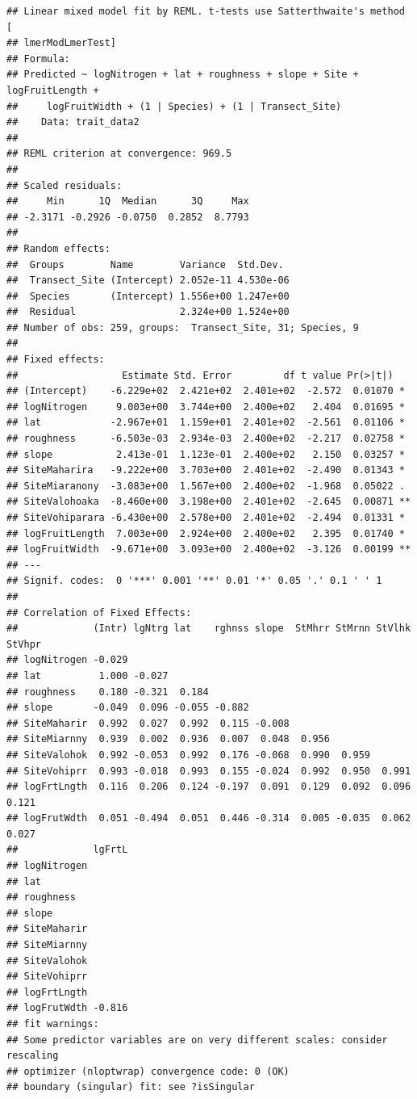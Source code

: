 \documentclass[
  12pt,
]{article}
\begin{document}
\begin{verbatim}
## Linear mixed model fit by REML. t-tests use Satterthwaite's method [
## lmerModLmerTest]
## Formula: 
## Predicted ~ logNitrogen + lat + roughness + slope + Site + logFruitLength +  
##     logFruitWidth + (1 | Species) + (1 | Transect_Site)
##    Data: trait_data2
## 
## REML criterion at convergence: 969.5
## 
## Scaled residuals: 
##     Min      1Q  Median      3Q     Max 
## -2.3171 -0.2926 -0.0750  0.2852  8.7793 
## 
## Random effects:
##  Groups        Name        Variance  Std.Dev. 
##  Transect_Site (Intercept) 2.052e-11 4.530e-06
##  Species       (Intercept) 1.556e+00 1.247e+00
##  Residual                  2.324e+00 1.524e+00
## Number of obs: 259, groups:  Transect_Site, 31; Species, 9
## 
## Fixed effects:
##                  Estimate Std. Error         df t value Pr(>|t|)   
## (Intercept)    -6.229e+02  2.421e+02  2.401e+02  -2.572  0.01070 * 
## logNitrogen     9.003e+00  3.744e+00  2.400e+02   2.404  0.01695 * 
## lat            -2.967e+01  1.159e+01  2.401e+02  -2.561  0.01106 * 
## roughness      -6.503e-03  2.934e-03  2.400e+02  -2.217  0.02758 * 
## slope           2.413e-01  1.123e-01  2.400e+02   2.150  0.03257 * 
## SiteMaharira   -9.222e+00  3.703e+00  2.401e+02  -2.490  0.01343 * 
## SiteMiaranony  -3.083e+00  1.567e+00  2.400e+02  -1.968  0.05022 . 
## SiteValohoaka  -8.460e+00  3.198e+00  2.401e+02  -2.645  0.00871 **
## SiteVohiparara -6.430e+00  2.578e+00  2.401e+02  -2.494  0.01331 * 
## logFruitLength  7.003e+00  2.924e+00  2.400e+02   2.395  0.01740 * 
## logFruitWidth  -9.671e+00  3.093e+00  2.400e+02  -3.126  0.00199 **
## ---
## Signif. codes:  0 '***' 0.001 '**' 0.01 '*' 0.05 '.' 0.1 ' ' 1
## 
## Correlation of Fixed Effects:
##             (Intr) lgNtrg lat    rghnss slope  StMhrr StMrnn StVlhk StVhpr
## logNitrogen -0.029                                                        
## lat          1.000 -0.027                                                 
## roughness    0.180 -0.321  0.184                                          
## slope       -0.049  0.096 -0.055 -0.882                                   
## SiteMaharir  0.992  0.027  0.992  0.115 -0.008                            
## SiteMiarnny  0.939  0.002  0.936  0.007  0.048  0.956                     
## SiteValohok  0.992 -0.053  0.992  0.176 -0.068  0.990  0.959              
## SiteVohiprr  0.993 -0.018  0.993  0.155 -0.024  0.992  0.950  0.991       
## logFrtLngth  0.116  0.206  0.124 -0.197  0.091  0.129  0.092  0.096  0.121
## logFrutWdth  0.051 -0.494  0.051  0.446 -0.314  0.005 -0.035  0.062  0.027
##             lgFrtL
## logNitrogen       
## lat               
## roughness         
## slope             
## SiteMaharir       
## SiteMiarnny       
## SiteValohok       
## SiteVohiprr       
## logFrtLngth       
## logFrutWdth -0.816
## fit warnings:
## Some predictor variables are on very different scales: consider rescaling
## optimizer (nloptwrap) convergence code: 0 (OK)
## boundary (singular) fit: see ?isSingular
\end{verbatim}
\end{document}
